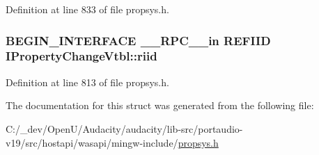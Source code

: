 Definition at line 833 of file propsys.\+h.

\subsubsection[{\texorpdfstring{riid}{riid}}]{\setlength{\rightskip}{0pt plus 5cm}B\+E\+G\+I\+N\+\_\+\+I\+N\+T\+E\+R\+F\+A\+CE {\bf \+\_\+\+\_\+\+R\+P\+C\+\_\+\+\_\+in} {\bf R\+E\+F\+I\+ID} I\+Property\+Change\+Vtbl\+::riid}\hypertarget{struct_i_property_change_vtbl_a8a327cef89ca4a62bb79d22de5ccdb4b}{}\label{struct_i_property_change_vtbl_a8a327cef89ca4a62bb79d22de5ccdb4b}


Definition at line 813 of file propsys.\+h.



The documentation for this struct was generated from the following file\+:\begin{DoxyCompactItemize}
\item 
C\+:/\+\_\+dev/\+Open\+U/\+Audacity/audacity/lib-\/src/portaudio-\/v19/src/hostapi/wasapi/mingw-\/include/\hyperlink{propsys_8h}{propsys.\+h}\end{DoxyCompactItemize}
